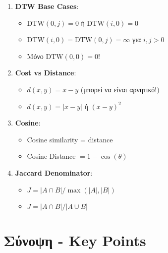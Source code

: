 \begin{warningbox}
\begin{enumerate}
    \item \textbf{DTW Base Cases}:
    \begin{itemize}
        \item[$\times$] $\text{DTW}(0,j) = 0$ ή $\text{DTW}(i,0) = 0$
        \item[\checkmark] $\text{DTW}(i,0) = \text{DTW}(0,j) = \infty$ για $i,j > 0$
        \item[\checkmark] Μόνο $\text{DTW}(0,0) = 0$!
    \end{itemize}

    \item \textbf{Cost vs Distance}:
    \begin{itemize}
        \item[$\times$] $d(x,y) = x - y$ (μπορεί να είναι αρνητικό!)
        \item[\checkmark] $d(x,y) = |x - y|$ ή $(x-y)^2$
    \end{itemize}

    \item \textbf{Cosine}:
    \begin{itemize}
        \item[$\times$] Cosine similarity = distance
        \item[\checkmark] Cosine Distance $= 1 - \cos(\theta)$
    \end{itemize}

    \item \textbf{Jaccard Denominator}:
    \begin{itemize}
        \item[$\times$] $J = |A \cap B| / \max(|A|, |B|)$
        \item[\checkmark] $J = |A \cap B| / |A \cup B|$
    \end{itemize}
\end{enumerate}
\end{warningbox}

\section{Σύνοψη - Key Points}

